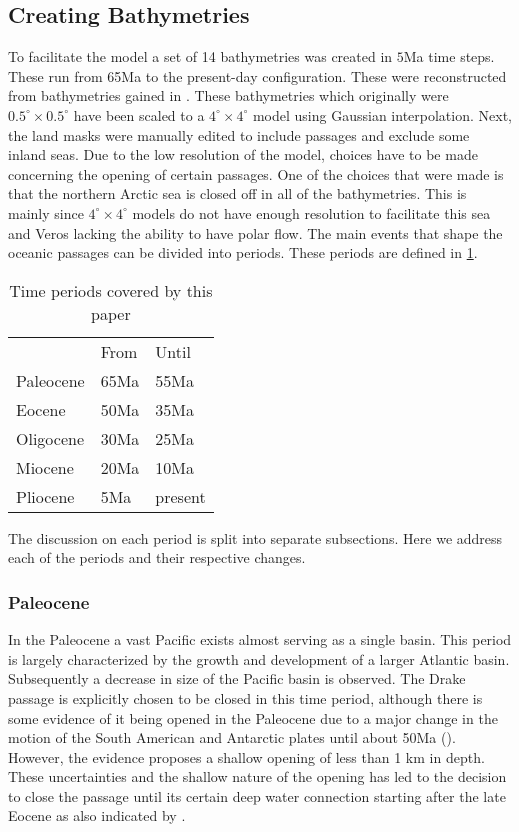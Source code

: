 \subsection{Creating Bathymetries} \label{sec:bathys}
To facilitate the model a set of 14 bathymetries was created in $5$Ma time steps. These run from 65Ma to the present-day configuration. These were reconstructed from bathymetries gained in \cite{Baatsen2016Aug}.
These bathymetries which originally were $0.5^{\circ} \times0.5^{\circ}$ have been scaled to a $4^{\circ} \times 4^{\circ}$  model using Gaussian interpolation. Next, the land masks were manually edited to include passages and exclude some inland seas. Due to the low resolution of the model, choices have to be made concerning the opening of certain passages. One of the choices that were made is that the northern Arctic sea is closed off in all of the bathymetries. This is mainly since $4^{\circ} \times 4^{\circ}$ models do not have enough resolution to facilitate this sea and Veros lacking the ability to have polar flow.
The main events that shape the oceanic passages can be divided into periods. These periods are defined in \cref{tab:timeperiods}.
\begin{table}[H]
\centering
	\begin{tabular}{lll}
		&From &Until \\
		Paleocene & 65Ma&55Ma    \\
		Eocene    & 50Ma&35Ma     \\
		Oligocene & 30Ma&25Ma    \\
		Miocene   & 20Ma & 10Ma  \\
		Pliocene & 5Ma & present
	\end{tabular}
\caption{Time periods covered by this paper}
\label{tab:timeperiods}
\end{table}
The discussion on each period is split into separate subsections. Here we address each of the periods and their respective changes.

\subsubsection{Paleocene}
In the Paleocene a vast Pacific exists almost serving as a single basin. This period is largely characterized by the growth and development of a larger Atlantic basin. Subsequently a decrease in size of the Pacific basin is observed. The Drake passage is explicitly chosen to be closed in this time period, although there is some evidence of it being opened in the Paleocene due to a major change in the motion of the South American and Antarctic plates until about 50Ma (\cite{Livermore2005Jul}). However, the evidence proposes a shallow opening of less than 1 km in depth. These uncertainties and the shallow nature of the opening has led to the decision to close the passage until its certain deep water connection starting after the late Eocene as also indicated by \cite{Livermore2005Jul}.

